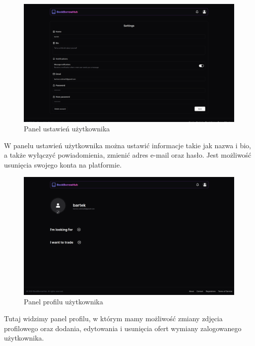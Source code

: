\documentclass[12pt]{article}
\begin{document}
\newpage
\begin{figure}[h!]
	\centering
	\includegraphics[width=17.5cm]{figures/Obraz15.png}
	\caption{Panel ustawień użytkownika}
\end{figure}
W panelu ustawień użytkownika można ustawić informacje 
takie jak nazwa i bio, a także wyłączyć powiadomienia, 
zmienić adres e-mail oraz hasło. 
Jest możliwość usunięcia swojego konta na platformie.

\newpage
\begin{figure}[h!]
	\centering
	\includegraphics[width=17.5cm]{figures/Obraz16.png}
	\caption{Panel profilu użytkownika}
\end{figure}
Tutaj widzimy panel profilu, 
w którym mamy możliwość zmiany zdjęcia profilowego oraz dodania, 
edytowania i usunięcia ofert wymiany zalogowanego użytkownika.
\end{document}
